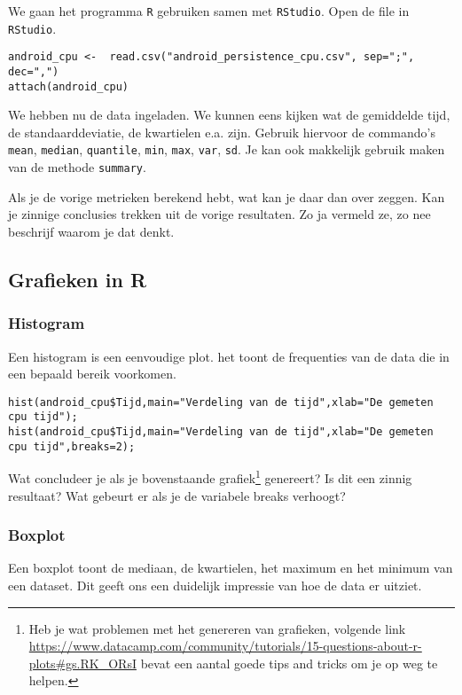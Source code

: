 We gaan het programma \texttt{R} gebruiken samen met \texttt{RStudio}. Open de file in \texttt{RStudio}.

\begin{lstlisting}
android_cpu <-  read.csv("android_persistence_cpu.csv", sep=";", dec=",")
attach(android_cpu)
\end{lstlisting}

We hebben nu de data ingeladen. We kunnen eens kijken wat de gemiddelde tijd, de standaarddeviatie, de kwartielen e.a. zijn. Gebruik hiervoor de commando's \texttt{mean}, \texttt{median}, \texttt{quantile}, \texttt{min}, \texttt{max}, \texttt{var}, \texttt{sd}. Je kan ook makkelijk gebruik maken van de methode \texttt{summary}.

\begin{exercise}
	Als je de vorige metrieken berekend hebt, wat kan je daar dan over zeggen. Kan je zinnige conclusies trekken uit de vorige resultaten. Zo ja vermeld ze, zo nee beschrijf waarom je dat denkt.
\end{exercise}

\subsection{Grafieken in R}

\subsubsection{Histogram}

Een histogram is een eenvoudige plot. het toont de frequenties van de data die in een bepaald bereik voorkomen. 

\begin{lstlisting}
hist(android_cpu$Tijd,main="Verdeling van de tijd",xlab="De gemeten cpu tijd");
hist(android_cpu$Tijd,main="Verdeling van de tijd",xlab="De gemeten cpu tijd",breaks=2);
\end{lstlisting}
\begin{exercise}
	Wat concludeer je als je bovenstaande grafiek\footnote{Heb je wat problemen met het genereren van grafieken, volgende link \url{https://www.datacamp.com/community/tutorials/15-questions-about-r-plots\#gs.RK_ORsI} bevat een aantal goede tips and tricks om je op weg te helpen.} genereert? Is dit een zinnig resultaat? Wat gebeurt er als je de variabele breaks verhoogt?
\end{exercise}

\subsubsection{Boxplot}
Een boxplot toont de mediaan, de kwartielen, het maximum en het minimum van een dataset. Dit geeft ons een duidelijk impressie van hoe de data er uitziet.

